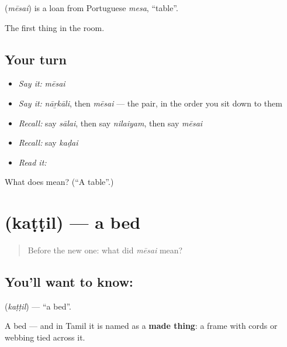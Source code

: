 \begin{cousinweb}
\textbf{} (\emph{mēsai}) is a loan from Portuguese \emph{mesa}, \textquotedblleft{}table\textquotedblright{}.
\end{cousinweb}

\begin{grammarlens}[title={What you've built}]
The first thing in the room.
\end{grammarlens}

\subsection*{Your turn}
\begin{itemize}
\raggedright
  \item \emph{Say it:} \emph{mēsai}
  \item \emph{Say it:} \emph{nāṟkāli}, then \emph{mēsai} — the pair, in the order you sit down to them
  \item \emph{Recall:} say \emph{sālai}, then say \emph{nilaiyam}, then say \emph{mēsai}
  \item \emph{Recall:} say \emph{kaḍai}
  \item \emph{Read it:} \textbf{}
\end{itemize}

\begin{tcolorbox}[breakable,colback=teal!4,colframe=teal!35!black,title={Before you move on}]
What does  mean? (\textquotedblleft{}A table\textquotedblright{}.)
\end{tcolorbox}
\section[\texorpdfstring{\ta{கட்டில்} (kaṭṭil)}{கட்டில் (kaṭṭil)}]{ (kaṭṭil) — a bed}

\label{lesson:TA-C70-bed}



\begin{quote}
Before the new one: what did \emph{mēsai} mean?
\end{quote}

\subsection*{You'll want to know: }
\textbf{} (\emph{kaṭṭil}) — \textquotedblleft{}a bed\textquotedblright{}.

A bed — and in Tamil it is named as a \textbf{made thing}: a frame with cords or webbing tied across it.


